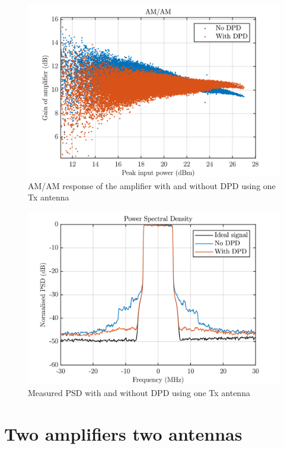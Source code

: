 \begin{figure}[H]
\centering 
\includegraphics[scale = 0.7]{figures/measurement/cree/meas2/AMAM.png}
\caption{AM/AM response of the amplifier with and without DPD using one Tx antenna}
\label{fig:meas_amp2_amam}
\end{figure}


\begin{figure}[H]
\centering 
\includegraphics[scale = 0.7]{figures/measurement/cree/meas2/PSD.png}
\caption{Measured PSD with and without DPD using one Tx antenna}
\label{fig:meas_amp2_PSD}
\end{figure}


\section{Two amplifiers two antennas}

